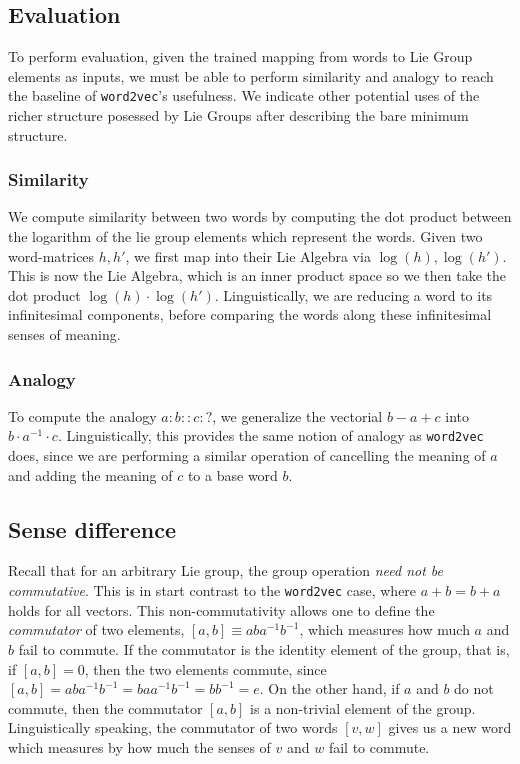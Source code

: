 \documentclass[11pt]{book}
\begin{document}

\subsection{Evaluation}

To perform evaluation, given the trained mapping from words to Lie Group
elements as inputs, we must be able to perform similarity and analogy to reach
the baseline of \texttt{word2vec}'s usefulness. We indicate other potential
uses of the richer structure posessed by Lie Groups after describing the bare
minimum structure.

\subsubsection{Similarity} We compute similarity between two words by computing
the dot product between the logarithm of the lie group elements which represent
the words. Given two word-matrices $h, h'$, we first map into their Lie Algebra
via $\log(h), \log(h')$. This is now the Lie Algebra, which is an inner product space so we then
take the dot product $\log(h) \cdot \log(h')$. Linguistically, we are reducing a word
to its infinitesimal components, before comparing the words along these infinitesimal
senses of meaning.


\subsubsection{Analogy} To compute the analogy $a:b::c:?$, we generalize the vectorial
$b - a + c$  into $b \cdot a^{-1} \cdot c$. Linguistically, this provides the same
notion of analogy as \texttt{word2vec} does, since we are performing a similar operation
of cancelling the meaning of $a$ and adding the meaning of $c$ to a base word $b$.

\subsection{Sense difference}

Recall that for an arbitrary Lie group, the group operation \emph{need not be commutative}. This is
in start contrast to the \texttt{word2vec} case, where $a + b = b + a$ holds for all vectors. This
non-commutativity allows one to define the \emph{commutator} of two elements, $[a, b] \equiv aba^{-1}b^{-1}$,
which measures how much $a$ and $b$ fail to commute. If the commutator is the identity element of the group,
that is, if $[a, b] = 0$, then the two elements commute, since $[a, b] = aba^{-1}b^{-1} = baa^{-1}b^{-1} = bb^{-1} = e$.
On the other hand, if $a$ and $b$ do not commute, then the commutator $[a, b]$ is a non-trivial element of
the group. Linguistically speaking, the commutator of two words $[v, w]$ gives us a new word which measures
by how much the senses of $v$ and $w$ fail to commute.
\end{document}
